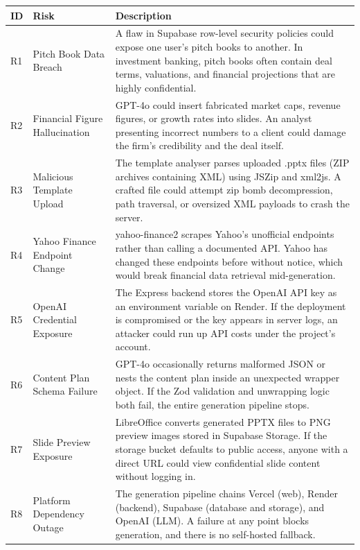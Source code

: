 \begin{table}[H]
\centering
\small
\begin{tabular}{|l|p{3.2cm}|p{8.5cm}|}
\hline
\rowcolor{gray!20} \textbf{ID} & \textbf{Risk} & \textbf{Description} \\
\hline
R1 & Pitch Book Data Breach & A flaw in Supabase row-level security policies could expose one user's pitch books to another. In investment banking, pitch books often contain deal terms, valuations, and financial projections that are highly confidential. \\
\hline
R2 & Financial Figure Hallucination & GPT-4o could insert fabricated market caps, revenue figures, or growth rates into slides. An analyst presenting incorrect numbers to a client could damage the firm's credibility and the deal itself. \\
\hline
R3 & Malicious Template Upload & The template analyser parses uploaded .pptx files (ZIP archives containing XML) using JSZip and xml2js. A crafted file could attempt zip bomb decompression, path traversal, or oversized XML payloads to crash the server. \\
\hline
R4 & Yahoo Finance Endpoint Change & yahoo-finance2 scrapes Yahoo's unofficial endpoints rather than calling a documented API. Yahoo has changed these endpoints before without notice, which would break financial data retrieval mid-generation. \\
\hline
R5 & OpenAI Credential Exposure & The Express backend stores the OpenAI API key as an environment variable on Render. If the deployment is compromised or the key appears in server logs, an attacker could run up API costs under the project's account. \\
\hline
R6 & Content Plan Schema Failure & GPT-4o occasionally returns malformed JSON or nests the content plan inside an unexpected wrapper object. If the Zod validation and unwrapping logic both fail, the entire generation pipeline stops. \\
\hline
R7 & Slide Preview Exposure & LibreOffice converts generated PPTX files to PNG preview images stored in Supabase Storage. If the storage bucket defaults to public access, anyone with a direct URL could view confidential slide content without logging in. \\
\hline
R8 & Platform Dependency Outage & The generation pipeline chains Vercel (web), Render (backend), Supabase (database and storage), and OpenAI (LLM). A failure at any point blocks generation, and there is no self-hosted fallback. \\

\end{tabular}
\end{table}
